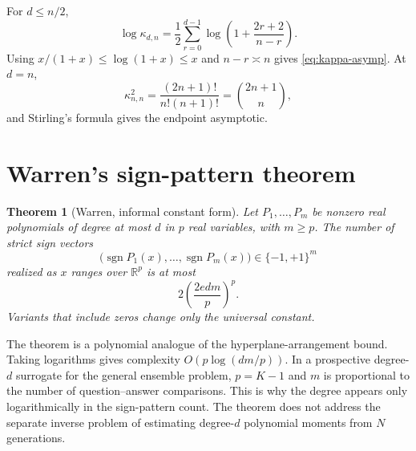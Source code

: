 \documentclass[11pt]{article}
\newtheorem{theorem}{Theorem}[section]
\newcommand{\R}{\mathbb R}
\newcommand{\sgn}{\operatorname{sgn}}
\begin{document}
For $d\le n/2$,
\[
\log\kappa_{d,n}
=\frac12\sum_{r=0}^{d-1}
\log\left(1+\frac{2r+2}{n-r}\right).
\]
Using $x/(1+x)\le\log(1+x)\le x$ and $n-r\asymp n$ gives \eqref{eq:kappa-asymp}.  At $d=n$,
\[
\kappa_{n,n}^2
=\frac{(2n+1)!}{n!(n+1)!}
=\binom{2n+1}{n},
\]
and Stirling's formula gives the endpoint asymptotic.

\section{Warren's sign-pattern theorem}
\label{app:warren}

\begin{theorem}[Warren, informal constant form]
Let $P_1,\dots,P_m$ be nonzero real polynomials of degree at most $d$ in $p$ real variables, with $m\ge p$.  The number of strict sign vectors
\[
\bigl(\sgn P_1(x),\dots,\sgn P_m(x)\bigr)\in\{-1,+1\}^m
\]
realized as $x$ ranges over $\R^p$ is at most
\[
2\left(\frac{2edm}{p}\right)^p.
\]
Variants that include zeros change only the universal constant.
\end{theorem}

The theorem is a polynomial analogue of the hyperplane-arrangement bound.  Taking logarithms gives complexity $O(p\log(dm/p))$.  In a prospective degree-$d$ surrogate for the general ensemble problem, $p=K-1$ and $m$ is proportional to the number of question--answer comparisons.  This is why the degree appears only logarithmically in the sign-pattern count.  The theorem does not address the separate inverse problem of estimating degree-$d$ polynomial moments from $N$ generations.
\end{document}
